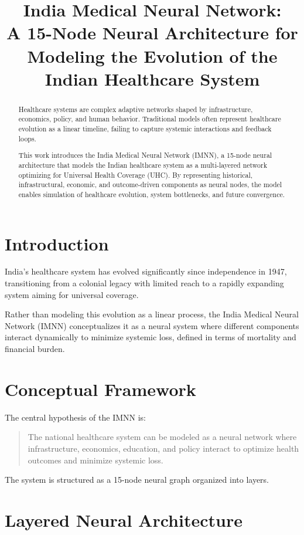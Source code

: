 \documentclass[12pt]{article}
\title{\textbf{India Medical Neural Network: \\ A 15-Node Neural Architecture for Modeling the Evolution of the Indian Healthcare System}}
\author{}
\date{}
\begin{document}
\maketitle

\begin{abstract}
Healthcare systems are complex adaptive networks shaped by infrastructure, economics, policy, and human behavior. Traditional models often represent healthcare evolution as a linear timeline, failing to capture systemic interactions and feedback loops.

This work introduces the India Medical Neural Network (IMNN), a 15-node neural architecture that models the Indian healthcare system as a multi-layered network optimizing for Universal Health Coverage (UHC). By representing historical, infrastructural, economic, and outcome-driven components as neural nodes, the model enables simulation of healthcare evolution, system bottlenecks, and future convergence.
\end{abstract}

\section{Introduction}

India’s healthcare system has evolved significantly since independence in 1947, transitioning from a colonial legacy with limited reach to a rapidly expanding system aiming for universal coverage.

Rather than modeling this evolution as a linear process, the India Medical Neural Network (IMNN) conceptualizes it as a neural system where different components interact dynamically to minimize systemic loss, defined in terms of mortality and financial burden.

\section{Conceptual Framework}

The central hypothesis of the IMNN is:

\begin{quote}
The national healthcare system can be modeled as a neural network where infrastructure, economics, education, and policy interact to optimize health outcomes and minimize systemic loss.
\end{quote}

The system is structured as a 15-node neural graph organized into layers.

\section{Layered Neural Architecture}
\end{document}
